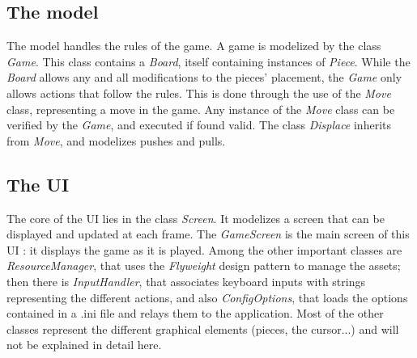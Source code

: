 \subsection{The model}

The model handles the rules of the game.
A game is modelized by the class \emph{Game}.
This class contains a \emph{Board}, itself containing instances of \emph{Piece}.
While the \emph{Board} allows any and all modifications to the pieces' placement, the \emph{Game} only allows actions that follow the rules.
This is done through the use of the \emph{Move} class, representing a move in the game.
Any instance of the \emph{Move} class can be verified by the \emph{Game}, and executed if found valid.
The class \emph{Displace} inherits from \emph{Move}, and modelizes pushes and pulls.

\subsection{The UI}

The core of the UI lies in the class \emph{Screen}.
It modelizes a screen that can be displayed and updated at each frame.
The \emph{GameScreen} is the main screen of this UI : it displays the game as it is played.
Among the other important classes are \emph{ResourceManager}, that uses the \emph{Flyweight} design pattern to manage the assets;
then there is \emph{InputHandler}, that associates keyboard inputs with strings representing the different actions,
and also \emph{ConfigOptions}, that loads the options contained in a .ini file and relays them to the application.
Most of the other classes represent the different graphical elements (pieces, the cursor...) and will not be explained in detail here.